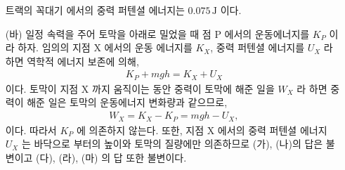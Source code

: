 \documentclass[floatfix,nofootinbib,superscriptaddress,fleqn]{revtex4-2}
\begin{document}
\begin{itemize}
  트랙의 꼭대기 에서의 중력 퍼텐셜 에너지는 $0.075\,\mathrm{J}$ 이다.
  \item[(바)]
  일정 속력을 주어 토막을 아래로 밀었을 때 점 P 에서의 운동에너지를 $K_P$ 이라 하자.
  임의의 지점 X 에서의 운동 에너지를 $K_X$, 중력 퍼텐셜 에너지를 $U_X$ 라
  하면 역학적 에너지 보존에 의해,
  \begin{align}
    K_P+mgh = K_X+U_X
  \end{align}
  이다. 토막이 지점 X 까지 움직이는 동안 중력이 토막에 해준 일을 $W_X$ 라 하면 
  중력이 해준 일은 토막의 운동에너지 변화량과 같으므로,
  \begin{align}
    W_X = K_X-K_P=mgh-U_X,
  \end{align}
  이다. 따라서 $K_P$ 에 의존하지 않는다. 또한, 
  지점 X 에서의 중력 퍼텐셜 에너지 $U_X$ 는 바닥으로 부터의 높이와 토막의 질량에만 
  의존하므로 (가), (나)의 답은 불변이고 (다), (라), (마) 의 답 또한 불변이다.
\end{itemize}
\end{document}
